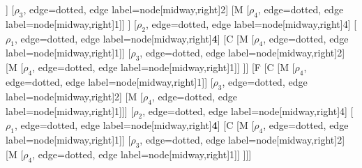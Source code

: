\begin{forest}
[B
	[F
		[C
			[M
				[$\rho_{4}$, edge=dotted, edge label={node[midway,right]{1}}]]
			[$\rho_{3}$, edge=dotted, edge label={node[midway,right]{2}}]
			[M
				[$\rho_{4}$, edge=dotted, edge label={node[midway,right]{1}}]]
		]
		[$\rho_{2}$, edge=dotted, edge label={node[midway,right]{4}}]
		[$\rho_{1}$, edge=dotted, edge label={node[midway,right]{\textbf{4}}}]
		[C
			[M
				[$\rho_{4}$, edge=dotted, edge label={node[midway,right]{1}}]]
			[$\rho_{3}$, edge=dotted, edge label={node[midway,right]{2}}]
			[M
				[$\rho_{4}$, edge=dotted, edge label={node[midway,right]{1}}]]
		]]
	[F
		[C
			[M
				[$\rho_{4}$, edge=dotted, edge label={node[midway,right]{1}}]]
			[$\rho_{3}$, edge=dotted, edge label={node[midway,right]{2}}]
			[M
				[$\rho_{4}$, edge=dotted, edge label={node[midway,right]{1}}]]]
		[$\rho_{2}$, edge=dotted, edge label={node[midway,right]{4}}]
		[$\rho_{1}$, edge=dotted, edge label={node[midway,right]{\textbf{4}}}]
		[C
			[M
				[$\rho_{4}$, edge=dotted, edge label={node[midway,right]{1}}]]
			[$\rho_{3}$, edge=dotted, edge label={node[midway,right]{2}}]
			[M
				[$\rho_{4}$, edge=dotted, edge label={node[midway,right]{1}}]]
	]]]
\end{forest}
